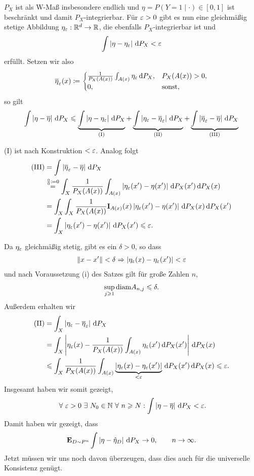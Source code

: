 $P_X$ ist als W-Maß insbesondere endlich und
$\eta=P(Y=1\mid\cdot)\in[0,1]$ ist beschränkt und damit $P_X$-integrierbar. Für
$\varepsilon  > 0$ gibt es nun eine gleichmäßig stetige Abbildung $\eta_\varepsilon :
\mathbb{R}^d\to\mathbb{R}$, die ebenfalls $P_X$-integrierbar ist und
\begin{align*}
\int\left|\eta-\eta_\varepsilon\right|\,\mathrm{d} P_X < \varepsilon 
\end{align*}
erfüllt. Setzen wir also
\begin{align*}
{\overline{\eta}}_\varepsilon(x) \coloneq
\begin{cases}
\frac{1}{P_X(A(x))}\int_{A(x)}\eta_\varepsilon\,\mathrm{d} P_X,& P_X(A(x)) > 0,\\
0, & \text{sonst},
\end{cases}
\end{align*}
so gilt
\begin{align*}
\int \left|\eta-{\overline{\eta}}\right|\,\mathrm{d} P_X
\leqslant
\underbrace{\int \left|\eta-\eta_\varepsilon\right|\,\mathrm{d} P_X}_{\text{(I)}}
+\underbrace{\int \left|\eta_\varepsilon-{\overline{\eta}}_\varepsilon\right|\,\mathrm{d} P_X}_{\text{(II)}}
+\underbrace{\int \left|{\overline{\eta}}_\varepsilon-{\overline{\eta}}\right|\,\mathrm{d} P_X}_{\text{(III)}}
\end{align*}

(I) ist nach Konstruktion $<\varepsilon$. Analog folgt
\begin{align*}
\text{(III)} &= \int \left|{\overline{\eta}}_\varepsilon-{\overline{\eta}}\right|\,\mathrm{d} P_X\\
&\overset{\frac{0}{0}\coloneq0}{=} \int_X \frac{1}{P_X(A(x))} \int_{A(x)}
\left|\eta_\varepsilon(x')-\eta(x')\right| \,\mathrm{d} P_X(x')\,\mathrm{d} P_X(x)\\
&=
\int_X\int_X \frac{1}{P_X(A(x))} \mathbf{I}_{A(x)}(x) \left|\eta_\varepsilon(x')-\eta(x')\right|
\,\mathrm{d} P_X(x)\,\mathrm{d} P_X(x')\\
&= \int_X \left|\eta_\varepsilon(x')-\eta(x')\right| \,\mathrm{d} P_X(x') \leqslant \varepsilon.
\end{align*}

Da $\eta_\varepsilon$ gleichmäßig stetig, gibt es ein $\delta > 0$, so dass
\begin{align*}
\left\|x-x'\right\|< \delta \Rightarrow \left|\eta_\varepsilon(x)-\eta_\varepsilon(x')\right| < \varepsilon
\end{align*}
und nach Voraussetzung (i) des Satzes gilt für große Zahlen $n$,
\begin{align*}
\sup_{j\geqslant 1} \mathrm{diam} A_{n,j} \leqslant \delta.
\end{align*}
Außerdem erhalten wir
\begin{align*}
\text{(II)} &= 
\int_X \left|\eta_\varepsilon - {\overline{\eta}}_\varepsilon\right|\,\mathrm{d} P_X\\
&=
\int_X \left|\eta_\varepsilon(x) - \frac{1}{P_X(A(x))}\int_{A(x)}
\eta_\varepsilon(x')\,\mathrm{d} P_X(x')\right|\,\mathrm{d} P_X(x)\\
&\leqslant
\int_X \frac{1}{P_X(A(x))}\int_{A(x)} \underbrace{\left|\eta_\varepsilon(x) -
\eta_\varepsilon(x')\right|}_{<\varepsilon}\,\mathrm{d} P_X(x')\,\mathrm{d} P_X(x)\leqslant \varepsilon. 
\end{align*}
Insgesamt haben wir somit gezeigt,
\begin{align*}
\forall \ep > 0 \exists N_0 \in\N \forall n\ge N : 
\int \abs{\eta-\bar{\eta}} \dP_X < \ep.
\end{align*}
Damit haben wir gezeigt, dass
\begin{align*}
\textbf{E}_{D\sim P^n} \int \left|\eta-\hat{\eta}_D\right| \,\mathrm{d} P_X \to 0,\qquad n\to \infty.
\end{align*}
Jetzt müssen wir uns noch davon überzeugen, dass dies auch für die universelle
Konsistenz genügt.

